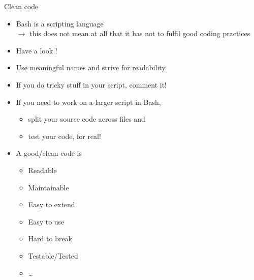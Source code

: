 \begin{frame}{Clean code}
    \vspace{-3mm}
    \begin{itemize}
        \setlength{\itemsep}{1mm}
        \item Bash is a scripting language\\ $\to$ this does not mean at all that it has not to fulfil good coding practices
        \item Have a look ! 
        \item Use meaningful names and strive for readability.
        \item If you do tricky stuff in your script, comment it!
        \item If you need to work on a larger script in Bash,
              \begin{itemize}
                  \item split your source code across files and
                  \item test your code, for real! 
              \end{itemize}
        \item A good/clean code is
              \begin{itemize}
                  \item Readable
                  \item Maintainable
                  \item Easy to extend
                  \item Easy to use
                  \item Hard to break
                  \item Testable/Tested
                  \item \ldots
              \end{itemize}
    \end{itemize}
\end{frame}















